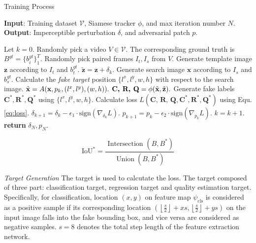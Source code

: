 \documentclass[journal]{IEEEtran}
\begin{document}
\begin{algorithm}[tb]
  \caption{Training Process}
  \label{alg:algorithm}
  \textbf{Input}: Training dataset $\mathcal{V}$, Siamese tracker $\phi$, and max iteration number $N$.\\
  \textbf{Output}: Imperceptible perturbation $\delta$, and adversarial patch $p$.
  \begin{algorithmic}[1] %
  \STATE Let $k = 0$.
  \STATE Randomly pick a video $V\in \mathcal{V}$. The corresponding ground truth is $B^{gt}=\{b^{gt}_i\}^T_1$.
  \STATE Randomly pick paired frames $I_t, I_s$ from $V$.
  \STATE Generate template image $\textbf{z}$ according to $I_t$ and $b^{gt}_t$.
  \STATE $\tilde{\textbf{z}} = \textbf{z} + \delta_k.$
  \STATE Generate search image $\textbf{x}$ according to $I_s$ and $b^{gt}_s$.
  \STATE Calculate the \textit{fake target} position $\{l^x, l^y, w, h\}$ with respect to the search image.
  \STATE $\tilde{\textbf x} = A(\textbf x, p_k, (l^x, l^y), (w, h)).$
  \STATE $\textbf{C, R, Q} = \phi(\tilde {\textbf x}, \tilde{\textbf z}).$
  \STATE Generate fake labels $\textbf{C}^*,\textbf{R}^*,\textbf{Q}^*$ using $\{l^x, l^y, w, h\}$.
  \STATE Calculate loss $L(\textbf{C, R, Q}, \textbf{C}^*, \textbf{R}^*, \textbf{Q}^*)$ using Equ. \ref{eq:loss}.
  \STATE $\delta_{k+1} = \delta_{k} - \epsilon_1 \cdot \text{sign}(\nabla_{\delta_k}L).$
  \STATE $p_{k+1} = p_{k} - \epsilon_2 \cdot \text{sign}(\nabla_{p_k}L).$
  \STATE $k = k + 1.$
  \ENDWHILE
  \STATE \textbf{return} $\delta_N, p_N.$
  \end{algorithmic}
  \label{alg}
\end{algorithm}

\begin{equation}
  \mathrm{IoU}^{*}=\frac{\text { Intersection }\left(B, B^{*}\right)}{\operatorname{Union}\left(B, B^{*}\right)}
\end{equation}

\textit{Target Generation} The target is used to calcutate the loss. The target composed of three part: classification target, regression target and quality estimation target. Specifically, for classification, location $(x,y)$ on feature map $\psi_{\mathrm{cls}}$ is considered as a positive sample if its corresponding location $\left(\left\lfloor\frac{s}{2}\right\rfloor+x s,\left\lfloor\frac{s}{2}\right\rfloor+y s\right)$ on the input image falls into the fake bounding box, and vice versa are considered as negative samples. $s=8$ denotes the total step length of the feature extraction network.
\end{document}
